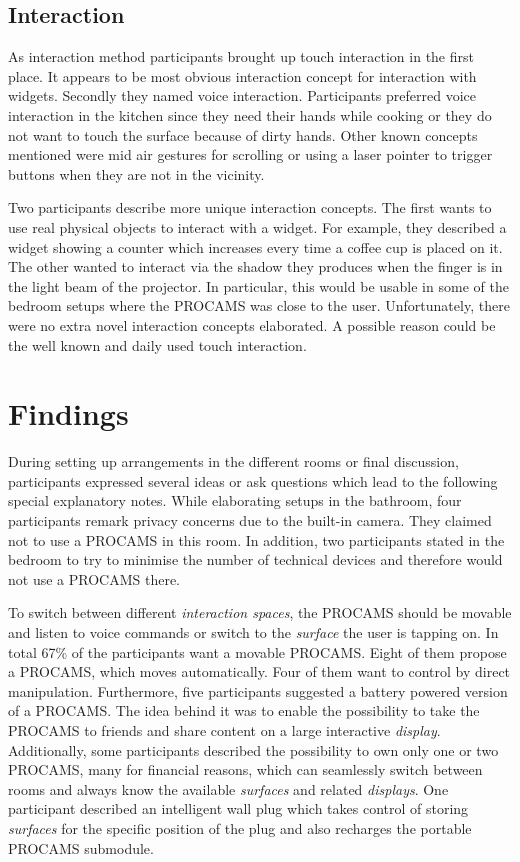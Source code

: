 \subsection{Interaction}
As interaction method participants brought up touch interaction in the first place. It appears to be most obvious interaction concept for interaction with widgets. Secondly they named voice interaction. Participants preferred voice interaction in the kitchen since they need their hands while cooking or they do not want to touch the surface because of dirty hands. Other known concepts mentioned were mid air gestures for scrolling or using a laser pointer to trigger buttons when they are not in the vicinity.

Two participants describe more unique interaction concepts. The first wants to use real physical objects to interact with a widget.  For example, they described a widget showing a counter which increases every time a coffee cup is placed on it. The other wanted to interact via the shadow they produces when the finger is in the light beam of the projector. In particular, this would be usable in some of the bedroom setups where the PROCAMS was close to the user.
Unfortunately, there were no extra novel interaction concepts elaborated. A possible reason could be the well known and daily used touch interaction.


\section{Findings}\label{sec:findings}
During setting up arrangements in the different rooms or final discussion, participants expressed several ideas or ask questions which lead to the following special explanatory notes. While elaborating setups in the bathroom, four participants remark privacy concerns due to the built-in camera. They claimed not to use a PROCAMS in this room. In addition, two participants stated in the bedroom to try to minimise the number of technical devices and therefore would not use a PROCAMS there.

To switch between different \emph{interaction spaces}, the \ac{PROCAMS} should be movable and listen to voice commands or switch to the \emph{surface} the user is tapping on. In total 67\% of the participants want a movable \ac{PROCAMS}. Eight of them propose a PROCAMS, which moves automatically. Four of them want to control by direct manipulation. Furthermore, five participants suggested a battery powered version of a \ac{PROCAMS}. The idea behind it was to enable the possibility to take the \ac{PROCAMS} to friends and share content on a large interactive \emph{display}. Additionally, some participants described the possibility to own only one or two \ac{PROCAMS}, many for financial reasons, which can seamlessly switch between rooms and always know the available \emph{surfaces} and related \emph{displays}. One participant described an intelligent wall plug which takes control of storing \emph{surfaces} for the specific position of the plug and also recharges the portable \ac{PROCAMS} submodule.

